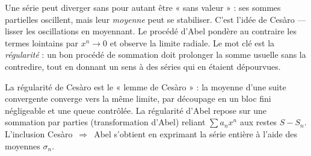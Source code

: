 \begin{significationintuitive}
Une série peut diverger sans pour autant être « sans valeur » : ses sommes
partielles oscillent, mais leur \emph{moyenne} peut se stabiliser. C'est l'idée
de Cesàro — lisser les oscillations en moyennant. Le procédé d'Abel pondère au
contraire les termes lointains par $x^n\to 0$ et observe la limite radiale. Le
mot clé est la \emph{régularité} : un bon procédé de sommation doit prolonger la
somme usuelle sans la contredire, tout en donnant un sens à des séries qui en
étaient dépourvues.
\end{significationintuitive}

\decsep{}


\begin{ideepreuve}
La régularité de Cesàro est le « lemme de Cesàro » : la moyenne d'une suite
convergente converge vers la même limite, par découpage en un bloc fini
négligeable et une queue contrôlée. La régularité d'Abel repose sur une
sommation par parties (transformation d'Abel) reliant $\sum a_n x^n$ aux restes
$S-S_n$. L'inclusion Cesàro~$\Rightarrow$~Abel s'obtient en exprimant la série
entière à l'aide des moyennes $\sigma_n$.
\end{ideepreuve}

\vspace{10pt}

